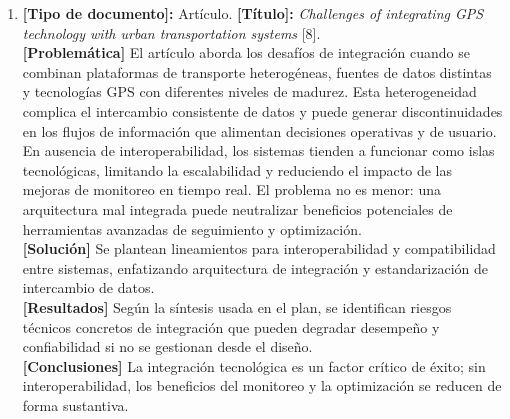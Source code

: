 \begin{enumerate}
    \item \textbf{[Tipo de documento]:} Artículo. \textbf{[Título]:} \textit{Challenges of integrating GPS technology with urban transportation systems} [8].\\
    \textbf{[Problemática]} El art\'{i}culo aborda los desaf\'{i}os de integraci\'{o}n cuando se combinan plataformas de transporte heterog\'{e}neas, fuentes de datos distintas y tecnolog\'{i}as GPS con diferentes niveles de madurez. Esta heterogeneidad complica el intercambio consistente de datos y puede generar discontinuidades en los flujos de informaci\'{o}n que alimentan decisiones operativas y de usuario. En ausencia de interoperabilidad, los sistemas tienden a funcionar como islas tecnol\'{o}gicas, limitando la escalabilidad y reduciendo el impacto de las mejoras de monitoreo en tiempo real. El problema no es menor: una arquitectura mal integrada puede neutralizar beneficios potenciales de herramientas avanzadas de seguimiento y optimizaci\'{o}n.\\
    \textbf{[Solución]} Se plantean lineamientos para interoperabilidad y compatibilidad entre sistemas, enfatizando arquitectura de integración y estandarización de intercambio de datos.\\
    \textbf{[Resultados]} Según la síntesis usada en el plan, se identifican riesgos técnicos concretos de integración que pueden degradar desempeño y confiabilidad si no se gestionan desde el diseño.\\
    \textbf{[Conclusiones]} La integración tecnológica es un factor crítico de éxito; sin interoperabilidad, los beneficios del monitoreo y la optimización se reducen de forma sustantiva.


\end{enumerate}
